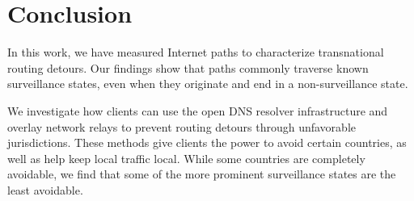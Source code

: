 \section{Conclusion}
\label{conclusion}

In this work, we have measured Internet paths to characterize transnational routing detours.  Our findings show that paths commonly traverse known surveillance states, even when they originate and end in a non-surveillance state. 

We investigate how clients can use the open DNS resolver infrastructure and overlay network relays to prevent routing detours through unfavorable jurisdictions.  These methods give clients the power to avoid certain countries, as well as help keep local traffic local.  While some countries are completely avoidable, we find that some of the more prominent surveillance states are the least avoidable.
